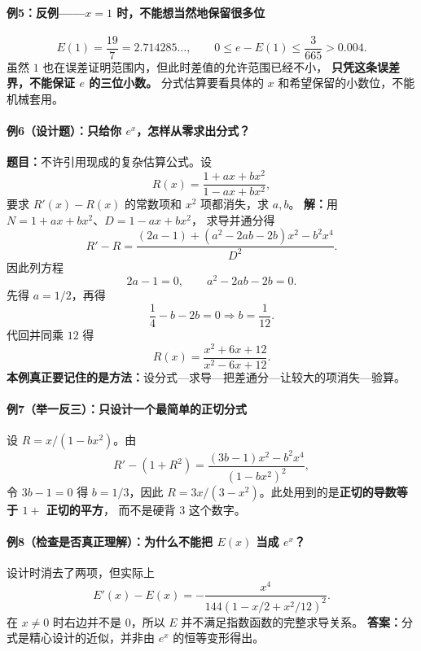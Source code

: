 \begin{examplebox}

\paragraph{例5：反例——$x=1$ 时，不能想当然地保留很多位}
\[
E(1)=\frac{19}{7}=2.714285\ldots,
\qquad 0\le e-E(1)\le\frac3{665}>0.004.
\]
虽然 $1$ 也在误差证明范围内，但此时差值的允许范围已经不小，
\textbf{只凭这条误差界，不能保证 $e$ 的三位小数。}
分式估算要看具体的 $x$ 和希望保留的小数位，不能机械套用。

\newpage
\paragraph{例6（设计题）：只给你 $e^x$，怎样从零求出分式？}
\textbf{题目：}不许引用现成的复杂估算公式。设
\[
 R(x)=\frac{1+ax+bx^2}{1-ax+bx^2},
\]
要求 $R'(x)-R(x)$ 的常数项和 $x^2$ 项都消失，求 $a,b$。
\textbf{解：}用 $N=1+ax+bx^2$、$D=1-ax+bx^2$，
求导并通分得
\[
 R'-R=\frac{(2a-1)+(a^2-2ab-2b)x^2-b^2x^4}{D^2}.
\]
因此列方程
\[
 2a-1=0,\qquad a^2-2ab-2b=0.
\]
先得 $a=1/2$，再得
\[
 \frac14-b-2b=0\Longrightarrow b=\frac1{12}.
\]
代回并同乘 $12$ 得
\[
 \boxed{R(x)=\frac{x^2+6x+12}{x^2-6x+12}}.
\]
\textbf{本例真正要记住的是方法：}设分式—求导—把差通分—让较大的项消失—验算。

\paragraph{例7（举一反三）：只设计一个最简单的正切分式}
设 $R=x/(1-bx^2)$。由
\[
 R'-(1+R^2)=\frac{(3b-1)x^2-b^2x^4}{(1-bx^2)^2},
\]
令 $3b-1=0$ 得 $b=1/3$，因此
$R=3x/(3-x^2)$。此处用到的是\textbf{正切的导数等于 $1+$ 正切的平方}，
而不是硬背 $3$ 这个数字。

\paragraph{例8（检查是否真正理解）：为什么不能把 $E(x)$ 当成 $e^x$？}
设计时消去了两项，但实际上
\[
 E'(x)-E(x)=-\frac{x^4}{144(1-x/2+x^2/12)^2}.
\]
在 $x\ne0$ 时右边并不是 $0$，所以 $E$ 并不满足指数函数的完整求导关系。
\textbf{答案：}分式是精心设计的近似，并非由 $e^x$ 的恒等变形得出。


\newpage

\end{examplebox}
